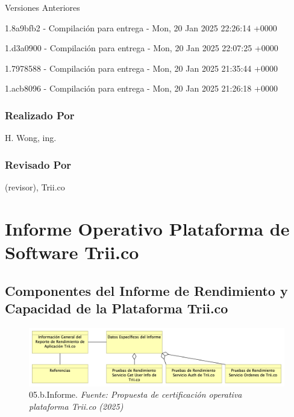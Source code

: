 \documentclass[
  paper=a4,
  ,captions=tableheading
]{scrartcl}
\renewenvironment{quote}{\begin{customblockquote}\list{}{\rightmargin=0em\leftmargin=0em}%
\item\relax\color{blockquote-text}\ignorespaces}{\unskip\unskip\endlist\end{customblockquote}}
\begin{document}
Versiones Anteriores

1.8a9bfb2 - Compilación para entrega - Mon, 20 Jan 2025 22:26:14 +0000

1.d3a0900 - Compilación para entrega - Mon, 20 Jan 2025 22:07:25 +0000

1.7978588 - Compilación para entrega - Mon, 20 Jan 2025 21:35:44 +0000

1.acb8096 - Compilación para entrega - Mon, 20 Jan 2025 21:26:18 +0000

\subsubsection{Realizado Por}\label{sec:realizado-por}

H. Wong, ing.

\subsubsection{Revisado Por}\label{sec:revisado-por}

(revisor), Trii.co

\newpage

\section{Informe Operativo Plataforma de Software
Trii.co}\label{sec:informe-operativo-plataforma-de-software-trii.co}

\subsection{Componentes del Informe de Rendimiento y Capacidad de la
Plataforma
Trii.co}\label{sec:componentes-del-informe-de-rendimiento-y-capacidad-de-la-plataforma-trii.co}

\begin{quote}
\end{quote}

\begin{figure}
\centering
\includegraphics{images/05.b.Informe.png}
\caption{05.b.Informe. \emph{Fuente: Propuesta de certificación
operativa plataforma Trii.co
(2025)}}\label{fig:id-04abc8f16f354757a52791da825e4049}
\end{figure}
\end{document}
